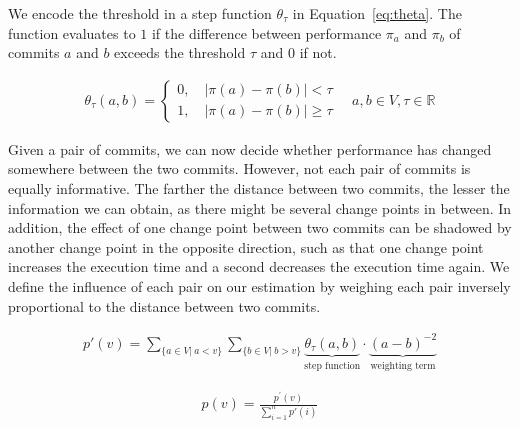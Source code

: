 \documentclass[sigconf]{acmart}
\begin{document}
	We encode the threshold in a step function $\theta_\tau$ in Equation~\ref{eq:theta}.
	The function evaluates to $1$ if the difference between performance $\pi_a$ and $\pi_b$ of commits $a$ and $b$ exceeds the threshold $\tau$ and $0$ if not.

	\begin{equation}\label{eq:theta}
	\begin{gathered}
		\theta_\tau(a, b) = \begin{cases}
		0,\quad \vert\pi(a) - \pi(b)\vert < \tau\\
		1,\quad \vert\pi(a) - \pi(b)\vert \geq \tau
		\end{cases}\quad a, b \in V, \tau \in \mathbb{R}
	\end{gathered}
	\end{equation}

	Given a pair of commits, we can now decide whether performance has changed somewhere between the two commits.
	However, not each pair of commits is equally informative.
	The farther the distance between two commits, the lesser the information we can obtain, as there might be several change points in between. 
	In addition, the effect of one change point between two commits can be shadowed by another change point in the opposite direction, such as that one change point increases the execution time and a second decreases the execution time again.
	We define the influence of each pair on our estimation by weighing each pair inversely proportional to the distance between two commits.

	\begin{equation}\label{eq:cpp}
	\begin{gathered}
	p'(v) = \sum_{\lbrace a \in V \vert~ a < v\rbrace} \sum_{\lbrace b \in V \vert~ b > v\rbrace} \underbrace{\theta_\tau(a, b)}_{\text{step function}} \cdot \underbrace{(a-b)^{-2}}_{\text{weighting term}}
	\end{gathered}
	\end{equation}

	\begin{equation}\label{eq:normalize}
	\begin{gathered}
	p(v) = \frac{p^\prime(v)}{\sum_{i=1}^{n} p'(i)}
	\end{gathered}
	\end{equation}
\end{document}
